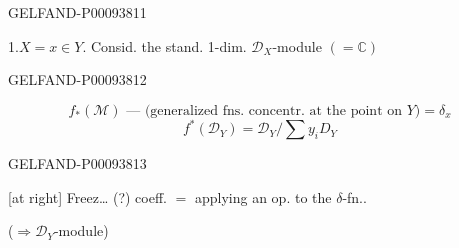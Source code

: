 \begin{GelfandAdjacentEvidence}{GELFAND-P000938}{11}


1.\enspace $X=x\in Y$. Consid. the stand. 1-dim. $\mathcal D_X$-module $(=\mathbb C)$
\end{GelfandAdjacentEvidence}
\begin{GelfandAdjacentEvidence}{GELFAND-P000938}{12}

\[
 f_*(\mathcal M)\text{ --- (generalized fns. concentr. at the point on }Y\text{)}=\delta_x
\]
\[
 f^*(\mathcal D_Y)=\mathcal D_Y/\sum y_iD_Y
\]
\end{GelfandAdjacentEvidence}
\begin{GelfandAdjacentEvidence}{GELFAND-P000938}{13}


[at right] Freez… (?) coeff. $=$ applying an op. to the $\delta$-fn..
\end{GelfandAdjacentEvidence}


($\Rightarrow\mathcal D_Y$-module)

